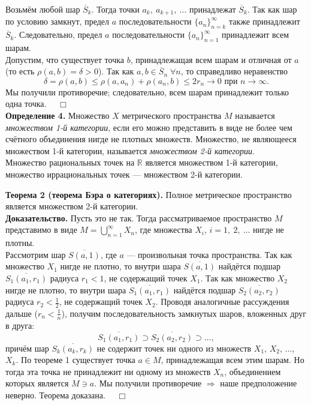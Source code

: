 \documentclass[12pt,a4paper, titlepage]{article}
\begin{document}
Возьмём любой шар $\overline{S}{}_k$. Тогда точки $a_k,\ a_{k+1},\ \dots$ принадлежат $\overline{S}{}_k$. Так как шар по условию замкнут, предел $a$ последовательности $\lbrace a_n \rbrace_{n=k}^{\infty}$ также принадлежит $\overline{S}{}_k$. Следовательно, предел $a$ последовательности $\lbrace a_n \rbrace_{n=1}^{\infty}$ принадлежит всем шарам.\\

Допустим, что существует точка $b$, принадлежащая всем шарам и отличная от $a$ (то есть $\rho(a, b) = \delta > 0$). Так как $a, b \in \overline{S}{}_n \; \forall n$, то справедливо неравенство
$$
\delta = \rho(a, b) \leqslant \rho(a, a_n) + \rho(a_n, b) \leqslant 2 r_n \rightarrow 0 \mbox{ при } n\to\infty.
$$
Мы получили противоречие; следовательно, всем шарам принадлежит только одна точка. $\quad \Box$\\ 

\textbf{Определение 4.} Множество $X$ метрического пространства $M$ называется \textit{множеством 1-й категории}, если его можно представить в виде не более чем счётного объединения нигде не плотных множеств. Множество, не являющееся множеством 1-й категории, называется \textit{множеством 2-й категории}.\\

Множество рациональных точек на $\mathbb{R}$ является множеством 1-й категории, множество иррациональных точек --- множеством 2-й категории.












\textbf{Теорема 2 (теорема Бэра о категориях).} Полное метрическое пространство является множеством 2-й категории.\\
\textbf{Доказательство.} Пусть это не так. Тогда рассматриваемое пространство $M$ представимо в виде $M = \bigcup\limits_{n=1}^\infty X_n$, где множества $X_i$, $i = 1,\ 2,\ \dots$ нигде не плотны.\\

Рассмотрим шар $\overline{S(a, 1)}$, где $a$ --- произвольная точка пространства. Так как множество $X_1$ нигде не плотно, то внутри шара $\overline{S(a, 1)}$ найдётся подшар $\overline{S_1(a_1, r_1)}$ радиуса $r_1 < 1$, не содержащий точек $X_1$. Так как множество $X_2$ нигде не плотно, то внутри шара $\overline{S_1(a_1, r_1)}$ найдётся подшар $\overline{S_2(a_2, r_2)}$ радиуса $r_2 < \frac 1 2$, не содержащий точек $X_2$. Проводя аналогичные рассуждения дальше ($r_n < \frac1n$), получим последовательность замкнутых шаров, вложенных друг в друга:
$$
\overline{S_1(a_1, r_1)} \supset \overline{S_2(a_2, r_2)} \supset \dots,
$$
причём шар $\overline{S_k(a_k, r_k)}$ не содержит точек ни одного из множеств $X_1$, $X_2$, $\dots$, $X_k$. По теореме 1 существует точка $a \in M$, принадлежащая всем этим шарам. Но тогда эта точка не принадлежит ни одному из множеств $X_n$, объединением которых является $M \ni a$. Мы получили противоречие $\Rightarrow$ наше предположение неверно. Теорема доказана. $\quad \Box$\\
\end{document}
